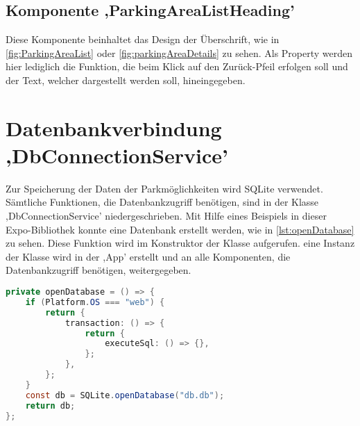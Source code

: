 \subsection{Komponente ,ParkingAreaListHeading'}
\label{parkingAreaListHeading}
Diese Komponente beinhaltet das Design der Überschrift, wie in \autoref{fig:ParkingAreaList} oder \autoref{fig:parkingAreaDetails} zu sehen. Als Property werden hier lediglich die Funktion, die beim Klick auf den Zurück-Pfeil erfolgen soll und der Text, welcher dargestellt werden soll, hineingegeben.

\section{Datenbankverbindung ,DbConnectionService'}
Zur Speicherung der Daten der Parkmöglichkeiten wird SQLite verwendet. Sämtliche Funktionen, die Datenbankzugriff benötigen, sind in der Klasse ,DbConnectionService' niedergeschrieben. Mit Hilfe eines Beispiels in dieser Expo-Bibliothek konnte eine Datenbank erstellt werden, wie in \autoref{lst:openDatabase} zu sehen. Diese Funktion wird im Konstruktor der Klasse aufgerufen. eine Instanz der Klasse wird in der ,App' erstellt und an alle Komponenten, die Datenbankzugriff benötigen, weitergegeben.

\begin{lstlisting}[caption={Das Erstellen einer Datenbank mit Hilfe eines Beispiels der genutzten Expo-Bibliothek SQLite. (Quelle: \cite{sqlite})},captionpos=b, language=Java, label=lst:openDatabase]
private openDatabase = () => {
	if (Platform.OS === "web") {
		return {
			transaction: () => {
				return {
					executeSql: () => {},
				};
			},
		};
	}
	const db = SQLite.openDatabase("db.db");
	return db;
};
\end{lstlisting}

